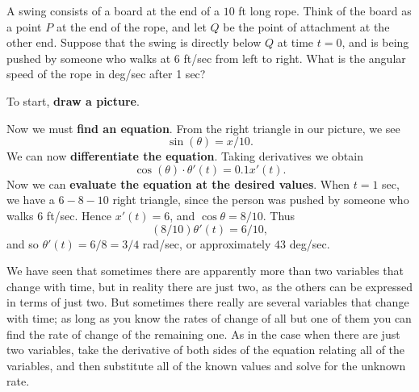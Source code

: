 \begin{example}
A swing consists of a board at the end of a $10$ ft long rope.  Think
of the board as a point $P$ at the end of the rope, and let $Q$ be the
point of attachment at the other end.  Suppose that the swing is
directly below $Q$ at time $t=0$, and is being pushed by someone who
walks at 6 ft/sec from left to right.  What is the angular speed of
the rope in deg/sec after 1 sec?
\end{example}

\begin{solution}
To start, \textbf{draw a picture}.


Now we must \textbf{find an equation}. From the right triangle in our
picture, we see
\[
\sin(\theta)=x/10.
\]
We can now \textbf{differentiate the equation}. Taking derivatives we obtain 
\[
\cos(\theta)\cdot \theta'(t)=0.1 x'(t).
\]
Now we can \textbf{evaluate the equation at the desired values}.  When
$t=1$ sec, we have a $6-8-10$ right triangle, since the person was
pushed by someone who walks $6$ ft/sec.  Hence $x'(t) = 6$, and 
$\cos\theta=8/10$. Thus 
\[
(8/10) \theta'(t) =6/10,
\]
and so  $\theta'(t)=6/8=3/4$ rad/sec, or approximately $43$ deg/sec.
\end{solution} 



We have seen that sometimes there are apparently more than two
variables that change with time, but in reality there are just two, as
the others can be expressed in terms of just two. But sometimes there
really are several variables that change with time; as long as you
know the rates of change of all but one of them you can find the rate
of change of the remaining one.  As in the case when there are just two
variables, take the derivative of both sides of the equation relating all of
the variables, and then substitute all of the known values and solve for
the unknown rate.



